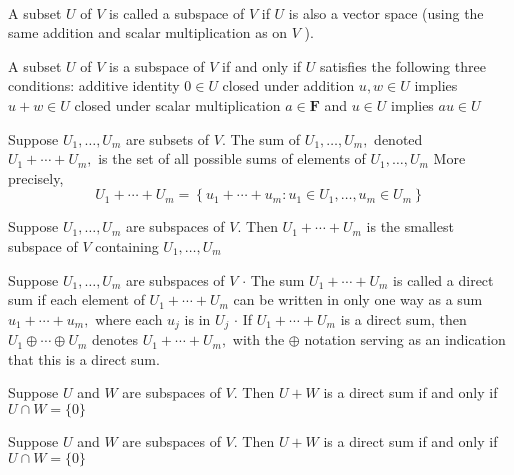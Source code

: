  \\

A subset $U$ of $V$ is called a subspace of $V$ if $U$ is also a vector space (using the same addition and scalar multiplication as on $V$ ).

A subset $U$ of $V$ is a subspace of $V$ if and only if $U$ satisfies the following three conditions:
additive identity
$0 \in U$
closed under addition $u, w \in U$ implies $u+w \in U$
closed under scalar multiplication
$a \in \mathbf{F}$ and $u \in U$ implies $a u \in U$

Suppose $U_{1}, \ldots, U_{m}$ are subsets of $V .$ The sum of $U_{1}, \ldots, U_{m},$ denoted $U_{1}+\cdots+U_{m},$ is the set of all possible sums of elements of $U_{1}, \ldots, U_{m}$ More precisely,
$$
U_{1}+\cdots+U_{m}=\left\{u_{1}+\cdots+u_{m}: u_{1} \in U_{1}, \ldots, u_{m} \in U_{m}\right\}
$$

Suppose $U_{1}, \ldots, U_{m}$ are subspaces of $V .$ Then $U_{1}+\cdots+U_{m}$ is the smallest subspace of $V$ containing $U_{1}, \ldots, U_{m}$

Suppose $U_{1}, \ldots, U_{m}$ are subspaces of $V$
$\cdot$ The sum $U_{1}+\cdots+U_{m}$ is called a direct sum if each element of $U_{1}+\cdots+U_{m}$ can be written in only one way as a sum $u_{1}+\cdots+u_{m},$ where each $u_{j}$ is in $U_{j}$
$\cdot$ If $U_{1}+\cdots+U_{m}$ is a direct sum, then $U_{1} \oplus \cdots \oplus U_{m}$ denotes $U_{1}+\cdots+U_{m},$ with the $\oplus$ notation serving as an indication that this is a direct sum.

Suppose $U$ and $W$ are subspaces of $V .$ Then $U+W$ is a direct sum if and only if $U \cap W=\{0\}$

Suppose $U$ and $W$ are subspaces of $V .$ Then $U+W$ is a direct sum if and only if $U \cap W=\{0\}$